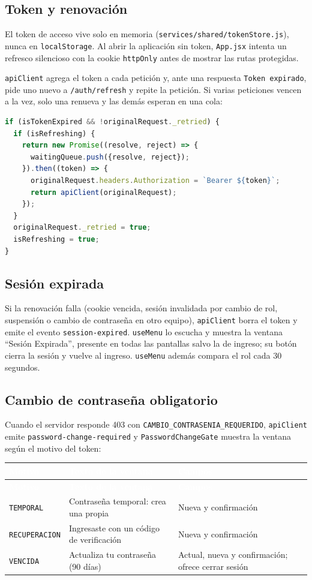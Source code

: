 \documentclass[11pt,letterpaper]{article}
\newcommand{\cabecera}{\rowcolor{maxamPrimario}}
\newcommand{\tth}[1]{\textcolor{white}{\textbf{#1}}}
\newcommand{\code}[1]{\nolinkurl{#1}}
\begin{document}
\subsection{Token y renovación}
El token de acceso vive solo en memoria (\code{services/shared/tokenStore.js}), nunca en \code{localStorage}. Al abrir la aplicación sin token, \code{App.jsx} intenta un refresco silencioso con la cookie \code{httpOnly} antes de mostrar las rutas protegidas.

\code{apiClient} agrega el token a cada petición y, ante una respuesta \code{Token expirado}, pide uno nuevo a \code{/auth/refresh} y repite la petición. Si varias peticiones vencen a la vez, solo una renueva y las demás esperan en una cola:

\begin{lstlisting}[language=JavaScript]
if (isTokenExpired && !originalRequest._retried) {
  if (isRefreshing) {
    return new Promise((resolve, reject) => {
      waitingQueue.push({resolve, reject});
    }).then((token) => {
      originalRequest.headers.Authorization = `Bearer ${token}`;
      return apiClient(originalRequest);
    });
  }
  originalRequest._retried = true;
  isRefreshing = true;
}
\end{lstlisting}

\subsection{Sesión expirada}
Si la renovación falla (cookie vencida, sesión invalidada por cambio de rol, suspensión o cambio de contraseña en otro equipo), \code{apiClient} borra el token y emite el evento \code{session-expired}. \code{useMenu} lo escucha y muestra la ventana ``Sesión Expirada'', presente en todas las pantallas salvo la de ingreso; su botón cierra la sesión y vuelve al ingreso. \code{useMenu} además compara el rol cada 30 segundos.

\subsection{Cambio de contraseña obligatorio}
Cuando el servidor responde 403 con \code{CAMBIO_CONTRASENIA_REQUERIDO}, \code{apiClient} emite \code{password-change-required} y \code{PasswordChangeGate} muestra la ventana según el motivo del token:

\begin{xltabular}{\textwidth}{L{3.2cm} L{5.4cm} Y}
\cabecera \tth{Motivo} & \tth{Texto de la ventana} & \tth{Campos} \\
\endfirsthead
\cabecera \tth{Motivo} & \tth{Texto de la ventana} & \tth{Campos} \\
\endhead
{} \code{TEMPORAL} & Contraseña temporal: crea una propia & Nueva y confirmación \\
\code{RECUPERACION} & Ingresaste con un código de verificación & Nueva y confirmación \\
 \code{VENCIDA} & Actualiza tu contraseña (90 días) & Actual, nueva y confirmación; ofrece cerrar sesión \\
\end{xltabular}
\end{document}
